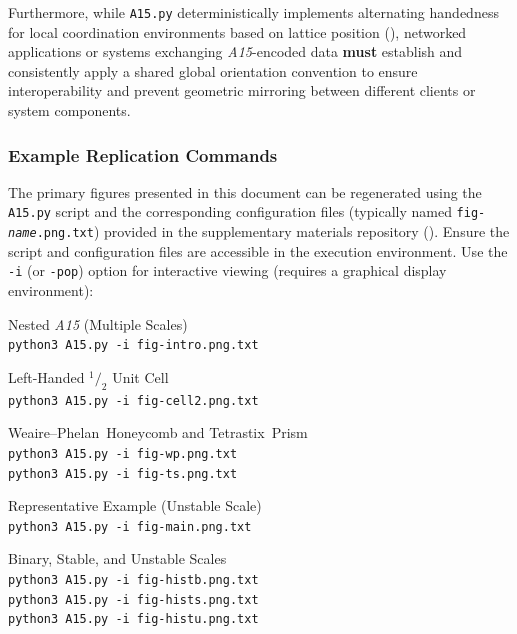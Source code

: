 \documentclass[10pt]{article}
\def\AAAB{\textit{A15}}
\def\WP{Weaire--Phelan}
\def\WPH{\WP{}~Honeycomb}
\def\TSP{Tetrastix~Prism}
\begin{document}
Furthermore, while \texttt{A15.py} deterministically implements alternating handedness for local coordination environments based on lattice position (), networked applications or systems exchanging \AAAB{}-encoded data \textbf{must} establish and consistently apply a shared global orientation convention to ensure interoperability and prevent geometric mirroring between different clients or system components.

\subsubsection{Example Replication Commands}\label{subsubsec-repl-commands}
The primary figures presented in this document can be regenerated using the \texttt{A15.py} script and the corresponding configuration files (typically named \texttt{fig-\textit{name}.png.txt}) provided in the supplementary materials repository (). Ensure the script and configuration files are accessible in the execution environment. Use the \texttt{-i} (or \texttt{-pop}) option for interactive viewing (requires a graphical display environment):

\begin{description} \itemsep0pt
    \item[\Cref{fig-intro} (Intro):] Nested \AAAB{} (Multiple Scales) \\
        \texttt{python3 A15.py -i fig-intro.png.txt}
    \item[\Cref{fig-cell2} (Internals):] Left-Handed $^1/_2$ Unit Cell \\
        \texttt{python3 A15.py -i fig-cell2.png.txt}
    \item[\Cref{fig-wp-ts} (Partitions):] \WPH{} and \TSP{} \\
        \texttt{python3 A15.py -i fig-wp.png.txt} \\
        \texttt{python3 A15.py -i fig-ts.png.txt}
    \item[\Cref{fig-main} (Composite):] Representative Example (Unstable Scale) \\
        \texttt{python3 A15.py -i fig-main.png.txt}
    \item[\Cref{fig-hist} (Histograms):] Binary, Stable, and Unstable Scales \\
        \texttt{python3 A15.py -i fig-histb.png.txt} \\
        \texttt{python3 A15.py -i fig-hists.png.txt} \\
        \texttt{python3 A15.py -i fig-histu.png.txt}
\end{description}
\end{document}
